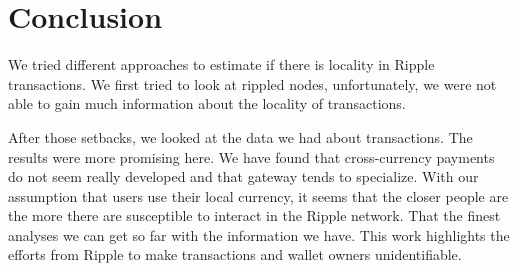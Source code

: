 \section{Conclusion}
We tried different approaches to estimate if there is locality in Ripple transactions. We first tried to look at rippled nodes, unfortunately, we were not able to gain much information about the locality of transactions. 

After those setbacks, we looked at the data we had about transactions. The results were more promising here. We have found that cross-currency payments do not seem really developed and that gateway tends to specialize. With our assumption that users use their local currency, it seems that the closer people are the more there are susceptible to interact in the Ripple network. That the finest analyses we can get so far with the information we have. This work highlights the efforts from Ripple to make transactions and wallet owners unidentifiable.